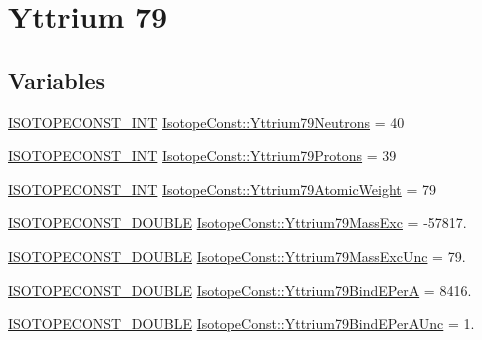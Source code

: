 \hypertarget{group___isotope_const-_yttrium-_y79}{}\section{Yttrium 79}
\label{group___isotope_const-_yttrium-_y79}
\subsection*{Variables}
\begin{DoxyCompactItemize}
\item 
\mbox{\hyperlink{group___isotope_const-_macros_ga5f18360b3e99483a35c32d789e62621c}{I\+S\+O\+T\+O\+P\+E\+C\+O\+N\+S\+T\+\_\+\+I\+NT}} \mbox{\hyperlink{group___isotope_const-_yttrium-_y79_ga781037a64ef08474dc41978fac0ead33}{Isotope\+Const\+::\+Yttrium79\+Neutrons}} = 40
\item 
\mbox{\hyperlink{group___isotope_const-_macros_ga5f18360b3e99483a35c32d789e62621c}{I\+S\+O\+T\+O\+P\+E\+C\+O\+N\+S\+T\+\_\+\+I\+NT}} \mbox{\hyperlink{group___isotope_const-_yttrium-_y79_gafc3092466f13ec3b068f76a9153d675c}{Isotope\+Const\+::\+Yttrium79\+Protons}} = 39
\item 
\mbox{\hyperlink{group___isotope_const-_macros_ga5f18360b3e99483a35c32d789e62621c}{I\+S\+O\+T\+O\+P\+E\+C\+O\+N\+S\+T\+\_\+\+I\+NT}} \mbox{\hyperlink{group___isotope_const-_yttrium-_y79_gab0a6a5ca791c0166bfa7c6ea257218c9}{Isotope\+Const\+::\+Yttrium79\+Atomic\+Weight}} = 79
\item 
\mbox{\hyperlink{group___isotope_const-_macros_ga8f45a7272ce02c0b4c65c44636ed719a}{I\+S\+O\+T\+O\+P\+E\+C\+O\+N\+S\+T\+\_\+\+D\+O\+U\+B\+LE}} \mbox{\hyperlink{group___isotope_const-_yttrium-_y79_gaa66f9160431a287cb749c32cd11ccafb}{Isotope\+Const\+::\+Yttrium79\+Mass\+Exc}} = -\/57817.
\item 
\mbox{\hyperlink{group___isotope_const-_macros_ga8f45a7272ce02c0b4c65c44636ed719a}{I\+S\+O\+T\+O\+P\+E\+C\+O\+N\+S\+T\+\_\+\+D\+O\+U\+B\+LE}} \mbox{\hyperlink{group___isotope_const-_yttrium-_y79_gac365b95022042f00305137aa722a9d5b}{Isotope\+Const\+::\+Yttrium79\+Mass\+Exc\+Unc}} = 79.
\item 
\mbox{\hyperlink{group___isotope_const-_macros_ga8f45a7272ce02c0b4c65c44636ed719a}{I\+S\+O\+T\+O\+P\+E\+C\+O\+N\+S\+T\+\_\+\+D\+O\+U\+B\+LE}} \mbox{\hyperlink{group___isotope_const-_yttrium-_y79_ga11caf8c092225f001a48370c0acb661f}{Isotope\+Const\+::\+Yttrium79\+Bind\+E\+PerA}} = 8416.
\item 
\mbox{\hyperlink{group___isotope_const-_macros_ga8f45a7272ce02c0b4c65c44636ed719a}{I\+S\+O\+T\+O\+P\+E\+C\+O\+N\+S\+T\+\_\+\+D\+O\+U\+B\+LE}} \mbox{\hyperlink{group___isotope_const-_yttrium-_y79_ga5cf7980c2d51d7a90cafd9f1f96c42ec}{Isotope\+Const\+::\+Yttrium79\+Bind\+E\+Per\+A\+Unc}} = 1.

\end{DoxyCompactItemize}

